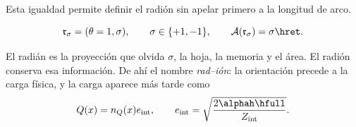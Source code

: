 Esta igualdad permite definir el radión sin apelar primero a la longitud de
arco.

\begin{definition}
\begin{equation}
\mathfrak r_\sigma=(\theta=1,\sigma),
\qquad \sigma\in\{+1,-1\},
\qquad
\mathcal A(\mathfrak r_\sigma)=\sigma\hret.
\label{eq:radion-oriented}
\end{equation}
\end{definition}

El radián es la proyección que olvida \(\sigma\), la hoja, la memoria y el
área. El radión conserva esa información. De ahí el nombre \emph{rad--ión}:
la orientación precede a la carga física, y la carga aparece más tarde como
\[
Q(x)=n_Q(x)e_{\mathrm{int}},\qquad
e_{\mathrm{int}}=\sqrt{\frac{2\alphah\hfull}{Z_{\mathrm{int}}}}.
\]

